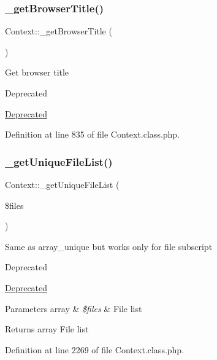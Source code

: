 \subsubsection{\texorpdfstring{\+\_\+get\+Browser\+Title()}{\_getBrowserTitle()}}
{\footnotesize\ttfamily Context\+::\+\_\+get\+Browser\+Title (\begin{DoxyParamCaption}{ }\end{DoxyParamCaption})}

Get browser title \begin{DoxyRefDesc}{Deprecated}
\item[\hyperlink{deprecated__deprecated000001}{Deprecated}]\end{DoxyRefDesc}


Definition at line 835 of file Context.\+class.\+php.

\mbox{\label{classContext_a8bde0f7d77424555f9b856664b59e0bc}} 
\subsubsection{\texorpdfstring{\+\_\+get\+Unique\+File\+List()}{\_getUniqueFileList()}}
{\footnotesize\ttfamily Context\+::\+\_\+get\+Unique\+File\+List (\begin{DoxyParamCaption}\item[{}]{\$files }\end{DoxyParamCaption})}

Same as array\+\_\+unique but works only for file subscript

\begin{DoxyRefDesc}{Deprecated}
\item[\hyperlink{deprecated__deprecated000006}{Deprecated}]\end{DoxyRefDesc}

\begin{DoxyParams}[1]{Parameters}
array & {\em \$files} & File list \\
\hline
\end{DoxyParams}
\begin{DoxyReturn}{Returns}
array File list 
\end{DoxyReturn}


Definition at line 2269 of file Context.\+class.\+php.

\mbox{\label{classContext_a3ad6fc7782e7234fe77357da28218310}} 
